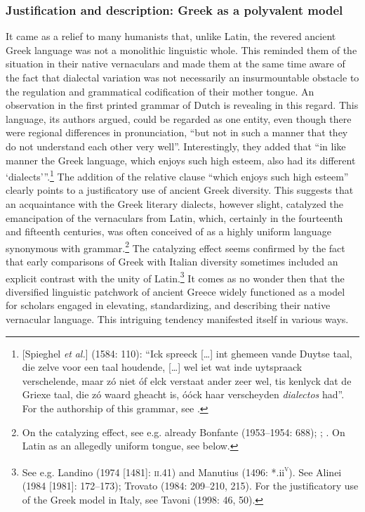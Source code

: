 \subsubsection{Justification and description: Greek as a polyvalent model}
\hypertarget{Toc19704860}{}
It came as a relief to many humanists that, unlike Latin, the revered ancient Greek language was not a monolithic linguistic whole. This reminded them of the situation in their native vernaculars and made them at the same time aware of the fact that dialectal variation was not necessarily an insurmountable obstacle to the regulation and grammatical codification of their mother tongue. An observation in the first printed grammar of Dutch is revealing in this regard. This language, its authors argued, could be regarded as one entity, even though there were regional differences in pronunciation, “but not in such a manner that they do not understand each other very well”. Interestingly, they added that “in like manner the Greek language, which enjoys such high esteem, also had its different ‘dialects’”.\footnote{[Spieghel \textit{et} \textit{al.}] (1584: 110): “Ick spreeck […] int ghemeen vande Duytse taal, die zelve voor een taal houdende, […] wel iet wat inde uytspraack verschelende, maar zó niet óf elck verstaat ander zeer wel, tis kenlyck dat de Griexe taal, die zó waard gheacht is, óóck haar verscheyden \textit{dialectos} had”. For the authorship of this grammar, see \citet{Peeters1982}.} The addition of the relative clause “which enjoys such high esteem” clearly points to a justificatory use of ancient Greek diversity. This suggests that an acquaintance with the Greek literary dialects, however slight, catalyzed the emancipation of the vernaculars from Latin, which, certainly in the fourteenth and fifteenth centuries, was often conceived of as a highly uniform language synonymous with grammar.\footnote{On the catalyzing effect, see e.g. already Bonfante (1953–1954: 688); \citet[9]{Trapp1990}; \citet[67]{Rhodes2015}. On Latin as an allegedly uniform tongue, see  below.} The catalyzing effect seems confirmed by the fact that early comparisons of Greek with Italian diversity sometimes included an explicit contrast with the unity of Latin.\footnote{See e.g. Landino (1974 [1481]: \textsc{ii}.41) and Manutius (1496: *.ii\textsc{\textsuperscript{v}}). See Alinei (1984 [1981]: 172–173); Trovato (1984: 209–210, 215). For the justificatory use of the Greek model in Italy, see Tavoni (1998: 46, 50).} It comes as no wonder then that the diversified linguistic patchwork of ancient Greece widely functioned as a model for scholars engaged in elevating, standardizing, and describing their native vernacular language. This intriguing tendency manifested itself in various ways.

